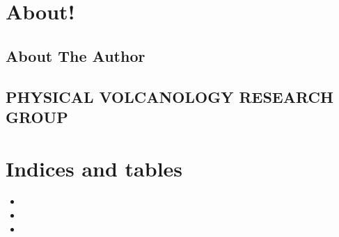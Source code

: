 \documentclass[letterpaper,10pt]{sphinxmanual}
\begin{document}
\chapter{About!}
\label{\detokenize{index:about}}
\sphinxstepscope


\section{About The Author}
\label{\detokenize{notebooks/aboutMe:about-the-author}}\label{\detokenize{notebooks/aboutMe::doc}}

\begin{quote}


\end{quote}

\sphinxstepscope


\section{PHYSICAL VOLCANOLOGY RESEARCH GROUP}
\label{\detokenize{notebooks/aboutUS:physical-volcanology-research-group}}\label{\detokenize{notebooks/aboutUS::doc}}

\begin{quote}


\end{quote}


\chapter{Indices and tables}
\label{\detokenize{index:indices-and-tables}}\begin{itemize}
\item {} 
\sphinxAtStartPar
{}

\item {} 
\sphinxAtStartPar
{}

\item {} 
\sphinxAtStartPar
{}

\end{itemize}



\renewcommand{\indexname}{Index}
\end{document}
